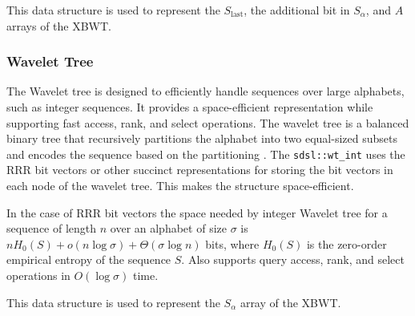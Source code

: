 This data structure is used to represent the $S_{\text{last}}$, the additional bit in $S_{\alpha}$, and $A$ arrays of the XBWT.

\subsubsection{Wavelet Tree}
The Wavelet tree is designed to efficiently handle sequences over large alphabets, such as integer sequences. It provides a space-efficient representation while supporting fast access, rank, and select operations. The wavelet tree is a balanced binary tree that recursively partitions the alphabet into two equal-sized subsets and encodes the sequence based on the partitioning \cite{grossi2003high}. The \texttt{sdsl::wt\_int} uses the RRR bit vectors or other succinct representations for storing the bit vectors in each node of the wavelet tree. This makes the structure space-efficient.

In the case of RRR bit vectors the space needed by integer Wavelet tree for a sequence of length $n$ over an alphabet of size $\sigma$ is $nH_0(S) + o(n \log \sigma) + \Theta(\sigma \log n)$ bits, where $H_0(S)$ is the zero-order empirical entropy of the sequence $S$. Also supports query access, rank, and select operations in $O(\log \sigma)$ time.

This data structure is used to represent the $S_\alpha$ array of the XBWT.

